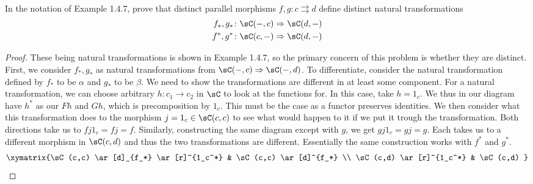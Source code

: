 \documentclass[main.tex]{subfiles}
\begin{document}
\paragraph{}
\begin{exercise}
	In the notation of Example 1.4.7, prove that distinct parallel morphisms
	$f,g\colon c\rightrightarrows d$ define distinct natural transformations
	\begin{align*}
		f_*,g_*\colon \sC(-,c) \Rightarrow \sC(d,-) \\
		f^*,g^*\colon \sC(c,-) \Rightarrow \sC(d,-)
	\end{align*}
\end{exercise}

\begin{proof}
	These being natural transformations is shown in Example 1.4.7, so the
	primary concern of this problem is whether they are distinct.  First, we
	consider $f_*,g_*$ as natural transformations from $\sC(-,c) \Rightarrow
	\sC(-,d)$.  To differentiate, consider the natural transformation defined by
	$f_*$ to be $\alpha$ and $g_*$ to be $\beta$.  We need to show the
	transformations are different in at least some component.  For a natural
	transformation, we can choose arbitrary $h\colon c_1 \rightarrow c_2$ in $\sC$ to
	look at the functions for.  In this case, take $h = 1_c$.  We thus in our
	diagram have $h^*$ as our $Fh$ and $Gh$, which is precomposition by $1_c$.
	This must be the case as a functor preserves identities.  We then consider
	what this transformation does to the morphism $j =1_c \in \sC(c,c)$ to see
	what would happen to it if we put it trough the transformation.  Both
	directions take us to $fj1_c = fj = f$.  Similarly, constructing the same
	diagram except with $g$, we get $gj1_c = gj = g$.  Each takes us to a
	different morphism in $\sC(c,d)$ and thus the two transformations are
	different.  Essentially the same construction works with $f^*$ and $g^*$.
	\begin{equation*}
		\xymatrix{\sC(c,c) \ar[d]_{f_*} \ar[r]^{1_c^*} & \sC(c,c) \ar[d]^{f_*} \\
		\sC(c,d) \ar[r]^{1_c^*} & \sC(c,d) }
	\end{equation*}
\end{proof}
\end{document}
